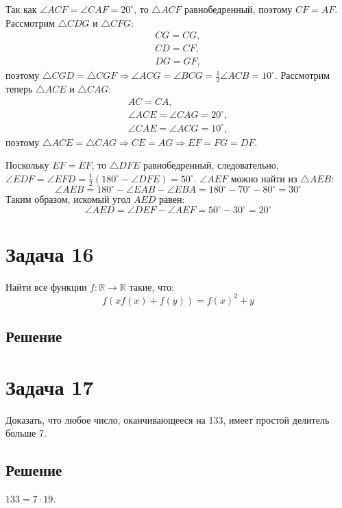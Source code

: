 \documentclass[11pt]{article}
\def\zall{\setcounter{lem}{0}\setcounter{cnsqnc}{0}\setcounter{th}{0}\setcounter{Cmt}{0}\setcounter{equation}{0}}
\newcounter{lem}\setcounter{lem}{0}
\newcounter{th}\setcounter{th}{0}
\newcounter{cnsqnc}\setcounter{cnsqnc}{0}
\newcounter{Cmt}\setcounter{Cmt}{0}
\begin{document}
Так как $\angle ACF = \angle CAF = 20^{\circ}$, то $\triangle ACF$ равнобедренный, поэтому $CF = AF$. Рассмотрим $\triangle CDG$ и $\triangle CFG$:
\begin{gather*}
CG = CG, \\
CD = CF, \\
DG = GF,
\end{gather*}
поэтому $\triangle CGD = \triangle CGF \Rightarrow \angle ACG = \angle BCG = \frac12\angle ACB = 10^{\circ}$. Рассмотрим теперь $\triangle ACE$ и $\triangle CAG$:
\begin{gather*}
AC = CA, \\
\angle ACE = \angle CAG = 20^{\circ}, \\
\angle CAE = \angle ACG = 10^{\circ},
\end{gather*}
поэтому $\triangle ACE = \triangle CAG \Rightarrow CE = AG \Rightarrow EF = FG = DF$.

Поскольку $EF = EF$, то $\triangle DFE$ равнобедренный, следовательно, $\angle EDF = \angle EFD = \frac12(180^{\circ} - \angle DFE) = 50^{\circ}$. $\angle AEF$ можно найти из $\triangle AEB$:
\begin{equation*}
\angle AEB = 180^{\circ} - \angle EAB - \angle EBA = 180^{\circ} - 70^{\circ} - 80^{\circ} = 30^{\circ}
\end{equation*}
Таким образом, искомый угол $AED$ равен:
\begin{equation}
\angle AED = \angle DEF - \angle AEF = 50^{\circ} - 30^{\circ} = 20^{\circ}
\end{equation}
\pagebreak
\section{Задача 16}
\label{sec:orga1c1c5e}
\zall
Найти все функции \(f: \mathbb{R} \to \mathbb{R}\) такие, что:
\begin{equation}
f(xf(x) + f(y)) = f(x)^2 + y
\end{equation}
\subsection{Решение}
\label{sec:org5de5445}
\pagebreak
\section{Задача 17}
\label{sec:org59751e9}
\zall
Доказать, что любое число, оканчивающееся на 133, имеет простой делитель больше 7.
\subsection{Решение}
\label{sec:org9a85d59}
$133 = 7\cdot19$.   
\pagebreak
\end{document}
